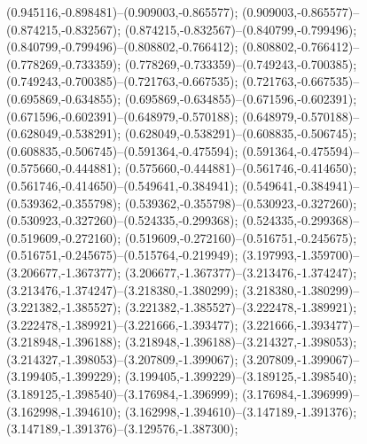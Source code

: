  (0.945116,-0.898481)--(0.909003,-0.865577);
 (0.909003,-0.865577)--(0.874215,-0.832567);
 (0.874215,-0.832567)--(0.840799,-0.799496);
 (0.840799,-0.799496)--(0.808802,-0.766412);
 (0.808802,-0.766412)--(0.778269,-0.733359);
 (0.778269,-0.733359)--(0.749243,-0.700385);
 (0.749243,-0.700385)--(0.721763,-0.667535);
 (0.721763,-0.667535)--(0.695869,-0.634855);
 (0.695869,-0.634855)--(0.671596,-0.602391);
 (0.671596,-0.602391)--(0.648979,-0.570188);
 (0.648979,-0.570188)--(0.628049,-0.538291);
 (0.628049,-0.538291)--(0.608835,-0.506745);
 (0.608835,-0.506745)--(0.591364,-0.475594);
 (0.591364,-0.475594)--(0.575660,-0.444881);
 (0.575660,-0.444881)--(0.561746,-0.414650);
 (0.561746,-0.414650)--(0.549641,-0.384941);
 (0.549641,-0.384941)--(0.539362,-0.355798);
 (0.539362,-0.355798)--(0.530923,-0.327260);
 (0.530923,-0.327260)--(0.524335,-0.299368);
 (0.524335,-0.299368)--(0.519609,-0.272160);
 (0.519609,-0.272160)--(0.516751,-0.245675);
 (0.516751,-0.245675)--(0.515764,-0.219949);
 (3.197993,-1.359700)--(3.206677,-1.367377);
 (3.206677,-1.367377)--(3.213476,-1.374247);
 (3.213476,-1.374247)--(3.218380,-1.380299);
 (3.218380,-1.380299)--(3.221382,-1.385527);
 (3.221382,-1.385527)--(3.222478,-1.389921);
 (3.222478,-1.389921)--(3.221666,-1.393477);
 (3.221666,-1.393477)--(3.218948,-1.396188);
 (3.218948,-1.396188)--(3.214327,-1.398053);
 (3.214327,-1.398053)--(3.207809,-1.399067);
 (3.207809,-1.399067)--(3.199405,-1.399229);
 (3.199405,-1.399229)--(3.189125,-1.398540);
 (3.189125,-1.398540)--(3.176984,-1.396999);
 (3.176984,-1.396999)--(3.162998,-1.394610);
 (3.162998,-1.394610)--(3.147189,-1.391376);
 (3.147189,-1.391376)--(3.129576,-1.387300);
